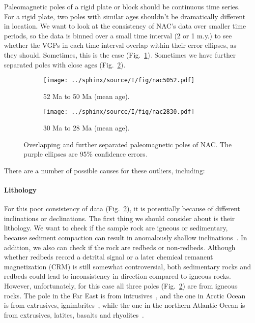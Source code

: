 Paleomagnetic poles of a rigid plate or block should be continuous time series.
For a rigid plate, two poles with similar ages shouldn't be dramatically
different in location. We want to look at the consistency of NAC's data over
smaller time periods, so the data is binned over a small time interval (2 or 1
m.y.) to see whether the VGPs in each time interval overlap within their error
ellipses, as they should. Sometimes, this is the case
(Fig.~\ref{Fig:chap_intro_nac5052agemean}). Sometimes we have further separated
poles with close ages (Fig.~\ref{Fig:chap_intro_nac2830agemean}).

\begin{figure*}[tbp]
  \captionsetup[subfigure]{labelformat=empty,aboveskip=-6pt,belowskip=-6pt}
  \centering
  \begin{subfigure}[htbp]{.49\textwidth}
    \centering
    \texttt{[image: ../sphinx/source/I/fig/nac5052.pdf]}
    \caption{52 Ma to 50 Ma (mean age).}\label{Fig:chap_intro_nac5052agemean}
  \end{subfigure}
  \begin{subfigure}[htbp]{.49\textwidth}
    \centering
    \texttt{[image: ../sphinx/source/I/fig/nac2830.pdf]}
    \caption{30 Ma to 28 Ma (mean age).}\label{Fig:chap_intro_nac2830agemean}
  \end{subfigure}
  \caption[Example of AMP Moving Averaging Effects]{Overlapping and further
  separated paleomagnetic poles of NAC\@. The purple
  ellipses are 95\% confidence errors.}\label{Fig:chap_intro_ma-amp}
\end{figure*}

There are a number of possible causes for these outliers, including:

\paragraph{Lithology}

For this poor consistency of data (Fig.~\ref{Fig:chap_intro_nac2830agemean}), it
is potentially because of different inclinations or declinations. The first
thing we should consider about is their lithology. We want to check if the
sample rock are igneous or sedimentary, because sediment compaction can result
in anomalously shallow inclinations~\cite{T19}. In addition, we also
can check if the rock are redbeds or non-redbeds. Although whether redbeds
record a detrital signal or a later chemical remanent magnetization (CRM) is
still somewhat controversial, both sedimentary rocks and redbeds could lead to
inconsistency in direction compared to igneous rocks. However, unfortunately,
for this case all three poles (Fig.~\ref{Fig:chap_intro_nac2830agemean}) are from
igneous rocks. The pole in the Far East is from intrusives~\cite{G92},
and the one in Arctic Ocean is from extrusives, ignimbrites~\cite{M92},
while the one in the northern Atlantic Ocean is from extrusives, latites,
basalts and rhyolites~\cite{S92}.

